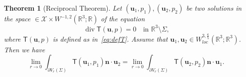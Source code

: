 \documentclass[final]{amsart}
\newtheorem{thm}{Theorem}[section]
\theoremstyle{definition}
\theoremstyle{definition}
\theoremstyle{remark}
\begin{document}
\begin{thm}[Reciprocal Theorem]\label{thm:reciprocal}
  Let $({\boldsymbol u}_1,p_1),({\boldsymbol u}_2,p_2)$ be two solutions in the space $\in
  \mathcal{X}\times W^{-1,2}({\mathbb R}^3;{\mathbb R})$ of the equation
\begin{equation}
{\operatorname{\mathrm{div}}}{\mathsf T}({\boldsymbol u},p)=0\quad\text{in ${\mathbb R}^3\setminus{\Sigma}$,}
\end{equation}
where ${\mathsf T}({\boldsymbol u},p)$ is defined as in~\eqref{eq:defT}. Assume that
${\boldsymbol u}_1,{\boldsymbol u}_2\in W^{3,\frac 6 5}_{loc}({\mathbb R}^3;{\mathbb R}^3)$.
Then we have
\[
\lim_{r\to 0}\int_{\partial V_r({\Sigma})}{\mathsf T}({\boldsymbol u}_1,p_1){\boldsymbol n}\cdot{\boldsymbol u}_2 = 
\lim_{r\to 0}\int_{\partial V_r({\Sigma})}{\mathsf T}({\boldsymbol u}_2,p_2){\boldsymbol n}\cdot{\boldsymbol u}_1. 
\]
\end{thm}
\end{document}
